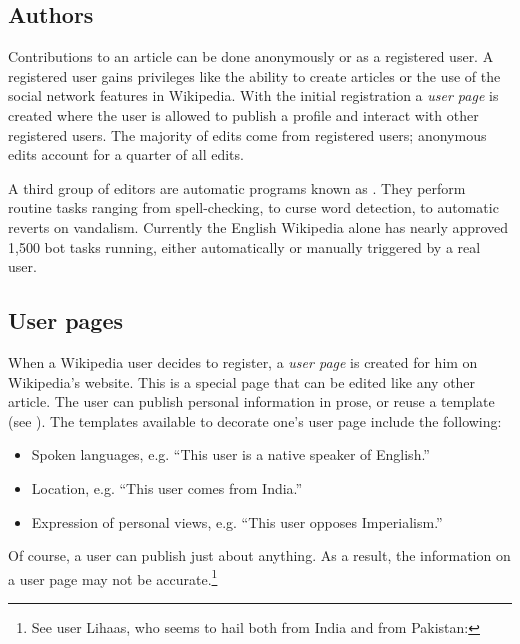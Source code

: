 \subsection{Authors}\label{sub:authors}

Contributions to an article can be done anonymously or as a registered user.
A registered user gains privileges like the ability to create articles or the use of the social network features in Wikipedia.
With the initial registration a \emph{user page} is created where the user is allowed to publish a profile and interact with other registered users.\cite{wikiwhyaccount}
The majority of edits come from registered users; anonymous edits account for a quarter of all edits.\cite{wpanonstats}

A third group of editors are automatic programs known as .
They perform routine tasks ranging from spell-checking, to curse word detection, to automatic reverts on vandalism.
Currently the English Wikipedia alone has nearly approved 1,500 bot tasks running, either automatically or manually triggered by a real user.\cite{wpbots}

\subsection{User pages}\label{sub:userpages}

When a Wikipedia user decides to register, a \emph{user page} is created for him on Wikipedia's website. 
This is a special page that can be edited like any other article.
The user can publish personal information in prose, or reuse a template (see ).
The templates available to decorate one's user page include the following: 
\begin{itemize}
  \item Spoken languages, e.g. ``This user is a native speaker of English.''
  \item Location, e.g. ``This user comes from India.''
  \item Expression of personal views, e.g. ``This user opposes Imperialism.''
\end{itemize}
Of course, a user can publish just about anything.
As a result, the information on a user page may not be accurate.\footnote{See user Lihaas, who seems to hail both from India and from Pakistan: }

